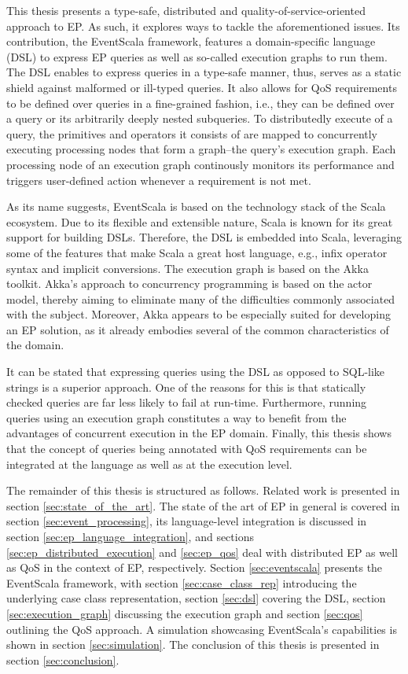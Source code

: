 \documentclass[article, type=bsc, colorback, accentcolor=tud8b, parskip=half, bibliography=totocnumbered]{tudthesis}
\begin{document}
This thesis presents a type-safe, distributed and quality-of-service-oriented approach to EP.
As such, it explores ways to tackle the aforementioned issues.
Its contribution, the EventScala framework, features a domain-specific language (DSL) to express EP queries as well as so-called execution graphs to run them.
The DSL enables to express queries in a type-safe manner, thus, serves as a static shield against malformed or ill-typed queries.
It also allows for QoS requirements to be defined over queries in a fine-grained fashion, i.e., they can be defined over a query or its arbitrarily deeply nested subqueries.
To distributedly execute of a query, the primitives and operators it consists of are mapped to concurrently executing processing nodes that form a graph--the query's execution graph.
Each processing node of an execution graph continously monitors its performance and triggers user-defined action whenever a requirement is not met.

As its name suggests, EventScala is based on the technology stack of the Scala ecosystem.
Due to its flexible and extensible nature, Scala is known for its great support for building DSLs.
Therefore, the DSL is embedded into Scala, leveraging some of the features that make Scala a great host language, e.g., infix operator syntax and implicit conversions.
The execution graph is based on the Akka toolkit.
Akka's approach to concurrency programming is based on the actor model, thereby aiming to eliminate many of the difficulties commonly associated with the subject.
Moreover, Akka appears to be especially suited for developing an EP solution, as it already embodies several of the common characteristics of the domain.

It can be stated that expressing queries using the DSL as opposed to SQL-like strings is a superior approach.
One of the reasons for this is that statically checked queries are far less likely to fail at run-time.
Furthermore, running queries using an execution graph constitutes a way to benefit from the advantages of concurrent execution in the EP domain.
Finally, this thesis shows that the concept of queries being annotated with QoS requirements can be integrated at the language as well as at the execution level.

The remainder of this thesis is structured as follows.
Related work is presented in section \ref{sec:state_of_the_art}.
The state of the art of EP in general is covered in section \ref{sec:event_processing}, its language-level integration is discussed in section \ref{sec:ep_language_integration}, and sections \ref{sec:ep_distributed_execution} and \ref{sec:ep_qos} deal with distributed EP as well as QoS in the context of EP, respectively.
Section \ref{sec:eventscala} presents the EventScala framework, with section \ref{sec:case_class_rep} introducing the underlying case class representation, section \ref{sec:dsl} covering the DSL, section \ref{sec:execution_graph} discussing the execution graph and section \ref{sec:qos} outlining the QoS approach.
A simulation showcasing EventScala's capabilities is shown in section \ref{sec:simulation}.
The conclusion of this thesis is presented in section \ref{sec:conclusion}. 
\end{document}
